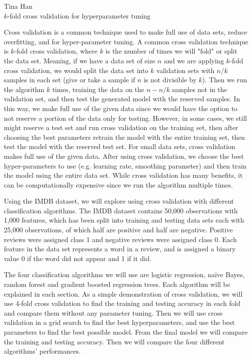 \documentclass[12pt,letterpaper]{article}
\author{Tina Giagnoni}
\begin{document}
\begin{flushleft}
Tina Han\\
$k$-fold cross validation for hyperparameter tuning
\end{flushleft}

Cross validation is a common technique used to make full use of data sets, reduce overfitting, and for hyper-parameter tuning. A common cross validation technique is $k$-fold cross validation, where $k$ is the number of times we will "fold" or split the data set. Meaning, if we have a data set of size $n$ and we are applying $k$-fold cross validation, we would split the data set into $k$ validation sets with $n/k$ samples in each set (give or take a sample if $n$ is not divisible by $k$). Then we run the algorithm $k$ times, training the data on the $n-n/k$ samples not in the validation set, and then test the generated model with the reserved samples. In this way, we make full use of the given data since we would have the option to not reserve a portion of the data only for testing. However, in some cases, we still might reserve a test set and run cross validation on the training set, then after choosing the best parameters retrain the model with the entire training set, then test the model with the reserved test set. For small data sets, cross validation makes full use of the given data. After using cross validation, we choose the best hyper-parameters to use (e.g. learning rate, smoothing parameter) and then train the model using the entire data set. While cross validation has many benefits, it can be computationally expensive since we run the algorithm multiple times.

Using the IMDB dataset, we will explore using cross validation with different classification algorithms. The IMDB dataset contains 50,000 observations with 1,000 features, which has been split into training and testing data sets each with 25,000 observations, of which half are positive and half are negative. Positive reviews were assigned class 1 and negative reviews were assigned class 0. Each feature in the data set represents a word in a review, and is assigned a binary value 0 if the word did not appear and 1 if it did. 

The four classification algorithms we will use are logistic regression, na\"ive Bayes, random forest and gradient boosted regression trees. Each algorithm will be explained in each section. As a simple demonstration of cross validation, we will use 4-fold cross validation to find the training and testing accuracy in each fold and compare them without any parameter tuning. Then we will use cross validation in a grid search to find the best hyperparameters, and use the best parameters to find the best possible model. From the final model we will compare the training and testing accuracy. Then we will compare the four different algorithms' performances.
\end{document}
